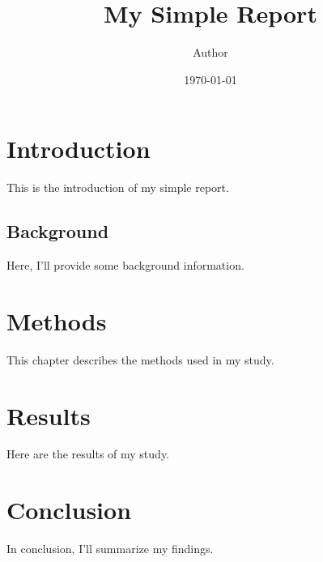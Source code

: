 \documentclass{report}
\title{My Simple Report}
\author{Author}
\date {\today}
\begin{document}
	\maketitle
	\tableofcontents
	\chapter{Introduction}
	This is the introduction of my simple report.
	\section{Background}
	Here, I'll provide some background information.
	\chapter{Methods}
	This chapter describes the methods used in my study.
	\chapter{Results}
	Here are the results of my study.
	\chapter{Conclusion}
	In conclusion, I'll summarize my findings.
\end{document}
